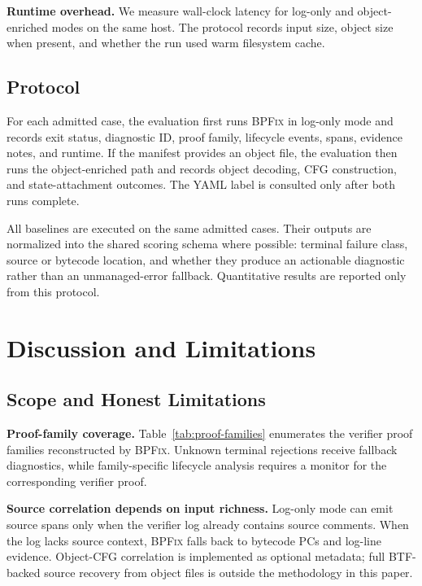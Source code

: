 \documentclass[sigplan,10pt,anonymous,review]{acmart}
\newcommand{\sys}{\textsc{BPFix}\xspace}
\begin{document}
\textbf{Runtime overhead.}  We measure wall-clock latency for log-only and
object-enriched modes on the same host.  The protocol records input size,
object size when present, and whether the run used warm filesystem cache.

\subsection{Protocol}
\label{sec:protocol}

For each admitted case, the evaluation first runs \sys in log-only mode and
records exit status, diagnostic ID, proof family, lifecycle events, spans,
evidence notes, and runtime.  If the manifest provides an object file, the
evaluation then runs the object-enriched path and records object decoding, CFG
construction, and state-attachment outcomes.  The YAML label is consulted only
after both runs complete.

All baselines are executed on the same admitted cases.  Their outputs are
normalized into the shared scoring schema where possible: terminal failure
class, source or bytecode location, and whether they produce an actionable
diagnostic rather than an unmanaged-error fallback.  Quantitative results are
reported only from this protocol.


\section{Discussion and Limitations}
\label{sec:discussion}

\subsection{Scope and Honest Limitations}

\textbf{Proof-family coverage.}  Table~\ref{tab:proof-families} enumerates the
verifier proof families reconstructed by \sys.  Unknown terminal rejections
receive fallback diagnostics, while family-specific lifecycle analysis requires
a monitor for the corresponding verifier proof.

\textbf{Source correlation depends on input richness.}  Log-only mode can emit
source spans only when the verifier log already contains source comments.  When
the log lacks source context, \sys falls back to bytecode PCs and log-line
evidence.  Object-CFG correlation is implemented as optional metadata; full
BTF-backed source recovery from object files is outside the methodology in this
paper.
\end{document}
